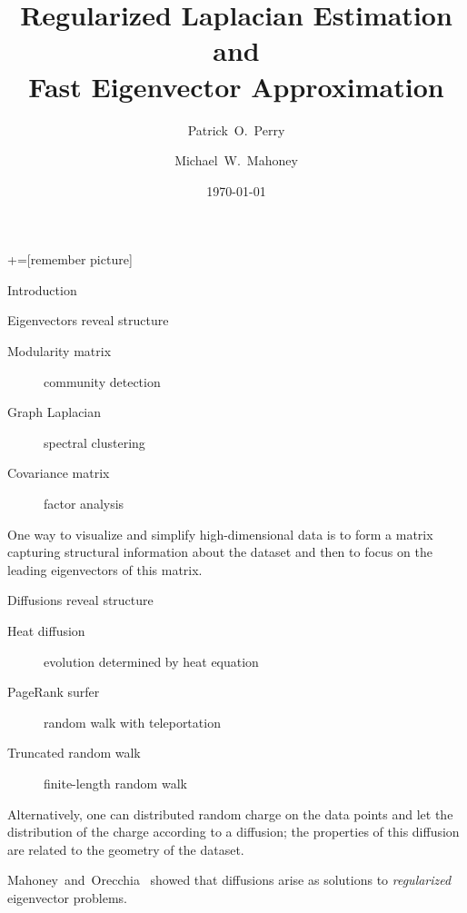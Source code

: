 \documentclass[xcolor=dvipsnames]{beamer}
\title{Regularized Laplacian Estimation and \\ Fast Eigenvector Approximation}
\author{Patrick~O.~Perry \and Michael~W.~Mahoney}
\institute[NYU Stern and Stanford] {
  NYU Stern \and Stanford University
}
\date{\today}
\begin{document}
+=[remember picture]

\everymath{\displaystyle}

\begin{frame}
  \titlepage
\end{frame}


\begin{frame}[c]
  \begin{block}{}
  \begin{center}
    \huge{Introduction}
  \end{center}
  \end{block}
\end{frame}


\begin{frame}
  \begin{block}{Eigenvectors reveal structure}
  \begin{description}
    \item[Modularity matrix] community detection
    \item[Graph Laplacian] spectral clustering
    \item[Covariance matrix] factor analysis
  \end{description}
  \end{block}
  
  One way to visualize and simplify high-dimensional data is to form a matrix
  capturing structural information about the dataset and then to focus on
  the leading eigenvectors of this matrix.
\end{frame}


\begin{frame}
  \begin{block}{Diffusions reveal structure}
  \begin{description}
    \item[Heat diffusion] evolution determined by heat equation
    \item[PageRank surfer] random walk with teleportation
    \item[Truncated random walk] finite-length random walk
  \end{description}
  \end{block}

  Alternatively, one can distributed random charge on the data points and
  let the distribution of the charge according to a diffusion; the properties
  of this diffusion are related to the geometry of the dataset.

  Mahoney~and~Orecchia~\cite{MO11-implementing} showed that diffusions arise
  as solutions to \emph{regularized} eigenvector problems.
\end{frame}
\end{document}
